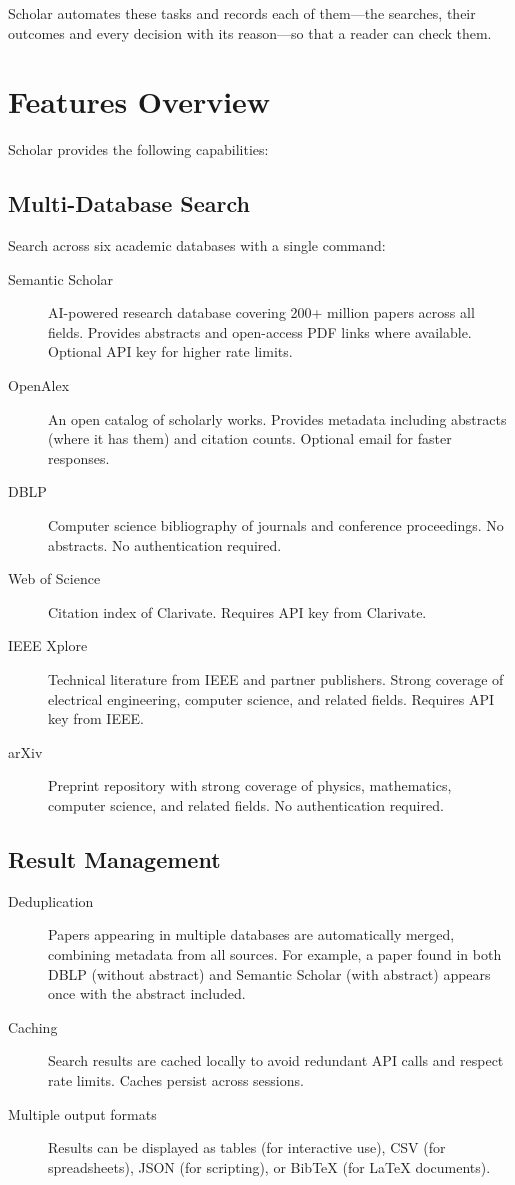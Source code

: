 Scholar automates these tasks and records each of them---the searches,
their outcomes and every decision with its reason---so that a reader can
check them.


\section{Features Overview}

Scholar provides the following capabilities:

\subsection{Multi-Database Search}

Search across six academic databases with a single command:
\begin{description}
\item[Semantic Scholar] AI-powered research database covering 200+ million 
  papers across all fields.
  Provides abstracts and open-access PDF links where available.
  Optional API key for higher rate limits.
\item[OpenAlex] An open catalog of scholarly works.
  Provides metadata including abstracts (where it has them) and citation
  counts.
  Optional email for faster responses.
\item[DBLP] Computer science bibliography of journals and conference
  proceedings.
  No abstracts.
  No authentication required.
\item[Web of Science] Citation index of Clarivate.
  Requires API key from Clarivate.
\item[IEEE Xplore] Technical literature from IEEE and partner publishers.
  Strong coverage of electrical engineering, computer science, and related 
  fields.
  Requires API key from IEEE.
\item[arXiv] Preprint repository with strong coverage of physics, mathematics,
  computer science, and related fields.
  No authentication required.
\end{description}

\subsection{Result Management}

\begin{description}
\item[Deduplication] Papers appearing in multiple databases are automatically 
  merged, combining metadata from all sources.
  For example, a paper found in both DBLP (without abstract) and Semantic 
  Scholar (with abstract) appears once with the abstract included.
\item[Caching] Search results are cached locally to avoid redundant API calls 
  and respect rate limits.
  Caches persist across sessions.
\item[Multiple output formats] Results can be displayed as tables (for 
  interactive use), CSV (for spreadsheets), JSON (for scripting), or BibTeX 
  (for \LaTeX{} documents).
\end{description}

